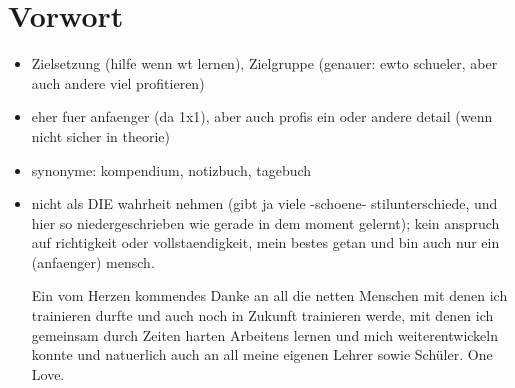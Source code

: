 
\section*{Vorwort}

\begin{itemize}
	\item Zielsetzung (hilfe wenn wt lernen), Zielgruppe (genauer: ewto schueler, aber auch andere viel profitieren)
	\item eher fuer anfaenger (da 1x1), aber auch profis ein oder andere detail (wenn nicht sicher in theorie)
	\item synonyme: kompendium, notizbuch, tagebuch
	\item nicht als DIE wahrheit nehmen (gibt ja viele -schoene- stilunterschiede, und hier so niedergeschrieben wie gerade in dem moment gelernt); kein anspruch auf richtigkeit oder vollstaendigkeit, mein bestes getan und bin auch nur ein (anfaenger) mensch.

Ein vom Herzen kommendes Danke an all die netten Menschen mit denen ich trainieren durfte und auch noch in Zukunft trainieren werde, mit denen ich gemeinsam durch Zeiten harten Arbeitens lernen und mich weiterentwickeln konnte und natuerlich auch an all meine eigenen Lehrer sowie Sch\"uler. One Love.
\end{itemize}
